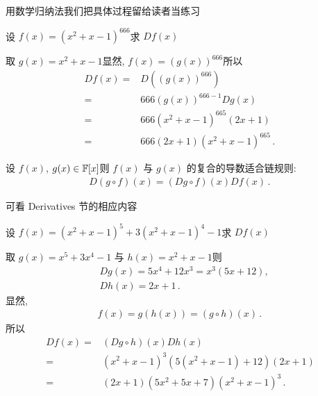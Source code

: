 \begin{pf}
    用数学归纳法\period 我们把具体过程留给读者当练习\period
\end{pf}

\begin{example}
    设 $f(x) = (x^2 + x - 1)^{666}$\period 求 $Df(x)$\period

    取 $g(x) = x^2 + x - 1$\period 显然, $f(x) = (g(x))^{666}$\period 所以
    \begin{align*}
        Df(x)
        = {} & D((g(x))^{666})                          \\
        = {} & 666 (g(x))^{666 - 1} Dg(x)               \\
        = {} & 666 (x^2 + x - 1)^{665} (2x + 1)         \\
        = {} & 666 (2x + 1) (x^2 + x - 1)^{665} \period
    \end{align*}
\end{example}

\begin{proposition}
    设 $f(x)$, $g(x) \in \mathbb{F}[x]$\period 则 $f(x)$ 与 $g(x)$ 的复合的导数适合链规则:
    \begin{align*}
        D(g \circ f) (x) = (Dg \circ f)(x) Df (x) \period
    \end{align*}
\end{proposition}

\begin{pf}
    可看 Derivatives 节的相应内容\period
\end{pf}

\begin{example}
    设 $f(x) = (x^2 + x - 1)^5 + 3 (x^2 + x - 1)^4 - 1$\period 求 $Df(x)$\period

    取 $g(x) = x^5 + 3x^4 - 1$ 与 $h(x) = x^2 + x - 1$\period 则
    \begin{align*}
         & Dg(x) = 5x^4 + 12x^3 = x^3 (5x + 12), \\
         & Dh(x) = 2x + 1 \period
    \end{align*}
    显然,
    \begin{align*}
        f(x) = g(h(x)) = (g \circ h) (x) \period
    \end{align*}
    所以
    \begin{align*}
        Df(x)
        = {} & (Dg \circ h)(x) Dh(x)                            \\
        = {} & (x^2 + x - 1)^3 (5(x^2 + x - 1) + 12) (2x + 1)   \\
        = {} & (2x + 1) (5x^2 + 5x + 7) (x^2 + x - 1)^3 \period
    \end{align*}
\end{example}

